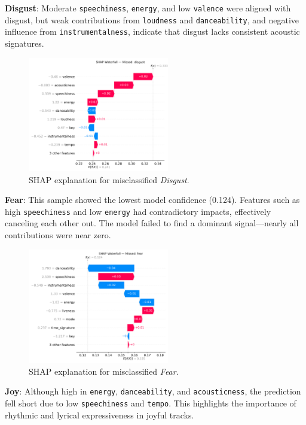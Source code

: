 \documentclass{article}
\begin{document}
\textbf{Disgust}: Moderate \texttt{speechiness}, \texttt{energy}, and low \texttt{valence} were aligned with disgust, but weak contributions from \texttt{loudness} and \texttt{danceability}, and negative influence from \texttt{instrumentalness}, indicate that disgust lacks consistent acoustic signatures.

\begin{figure}[H]
\centering
\includegraphics[width=0.55\textwidth]{Graphics/shap_missed_labels/disgust_missed_shap_waterfall.png}
\caption{SHAP explanation for misclassified \textit{Disgust}.}
\label{fig:shap_disgust}
\end{figure}

\textbf{Fear}: This sample showed the lowest model confidence (0.124). Features such as high \texttt{speechiness} and low \texttt{energy} had contradictory impacts, effectively canceling each other out. The model failed to find a dominant signal—nearly all contributions were near zero.

\begin{figure}[H]
\centering
\includegraphics[width=0.55\textwidth]{Graphics/shap_missed_labels/fear_missed_shap_waterfall.png}
\caption{SHAP explanation for misclassified \textit{Fear}.}
\label{fig:shap_fear}
\end{figure}

\textbf{Joy}: Although high in \texttt{energy}, \texttt{danceability}, and \texttt{acousticness}, the prediction fell short due to low \texttt{speechiness} and \texttt{tempo}. This highlights the importance of rhythmic and lyrical expressiveness in joyful tracks.
\end{document}
